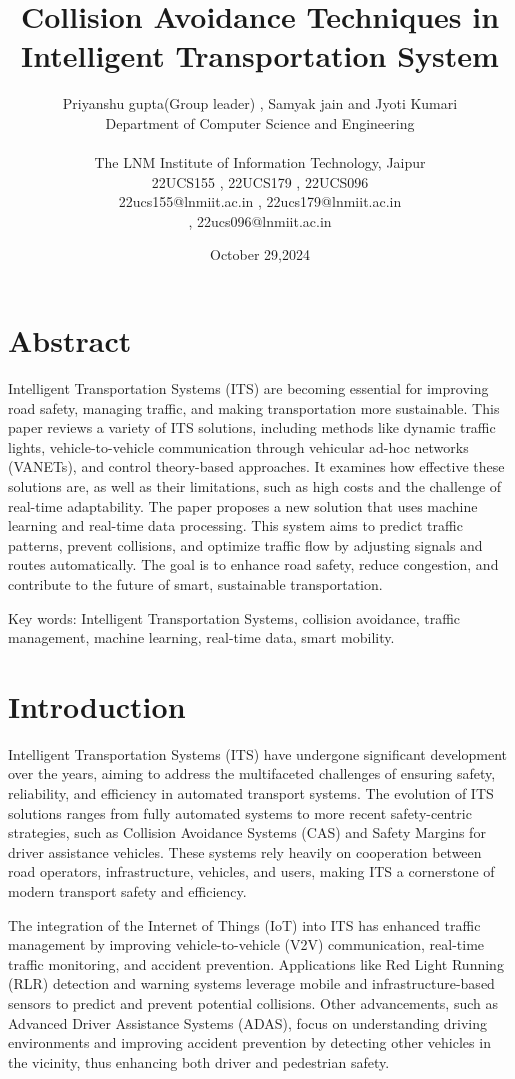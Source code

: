 \documentclass[12pt,twocolumn]{article}
\title{Collision Avoidance Techniques in Intelligent Transportation System}
\author{Priyanshu gupta(Group leader) , Samyak jain and Jyoti Kumari\\
Department of Computer Science and Engineering\\ \\ The LNM Institute of Information Technology, Jaipur\\ 22UCS155 , 22UCS179 , 22UCS096\\22ucs155@lnmiit.ac.in , 22ucs179@lnmiit.ac.in \\, 22ucs096@lnmiit.ac.in
}
\date{October 29,2024}
\begin{document}
\maketitle
\clearpage
\onecolumn
\tableofcontents
\twocolumn
\clearpage
\section{Abstract}
Intelligent Transportation Systems (ITS) are becoming essential for improving road safety, managing traffic, and making transportation more sustainable. This paper reviews a variety of ITS solutions, including methods like dynamic traffic lights, vehicle-to-vehicle communication through vehicular ad-hoc networks (VANETs), and control theory-based approaches. It examines how effective these solutions are, as well as their limitations, such as high costs and the challenge of real-time adaptability.
The paper proposes a new solution that uses machine learning and real-time data processing. This system aims to predict traffic patterns, prevent collisions, and optimize traffic flow by adjusting signals and routes automatically. The goal is to enhance road safety, reduce congestion, and contribute to the future of smart, sustainable transportation.

Key words: Intelligent Transportation Systems, collision avoidance, traffic management, machine learning, real-time data, smart mobility.
\section{Introduction}
Intelligent Transportation Systems (ITS) have undergone significant development over the years, aiming to address the multifaceted challenges of ensuring safety, reliability, and efficiency in automated transport systems. The evolution of ITS solutions ranges from fully automated systems to more recent safety-centric strategies, such as Collision Avoidance Systems (CAS) and Safety Margins for driver assistance vehicles. These systems rely heavily on cooperation between road operators, infrastructure, vehicles, and users, making ITS a cornerstone of modern transport safety and efficiency. 

The integration of the Internet of Things (IoT) into ITS has enhanced traffic management by improving vehicle-to-vehicle (V2V) communication, real-time traffic monitoring, and accident prevention. Applications like Red Light Running (RLR) detection and warning systems leverage mobile and infrastructure-based sensors to predict and prevent potential collisions. Other advancements, such as Advanced Driver Assistance Systems (ADAS), focus on understanding driving environments and improving accident prevention by detecting other vehicles in the vicinity, thus enhancing both driver and pedestrian safety.
\end{document}
